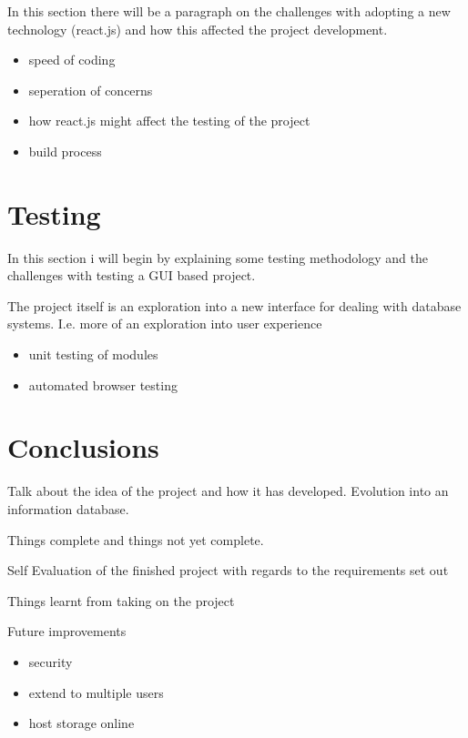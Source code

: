 \documentclass[a4paper, 11pt]{article}
\begin{document}
In this section there will be a paragraph on the challenges with adopting a new
technology (react.js) and how this affected the project development.

\begin{itemize}
  \item{speed of coding}
  \item{seperation of concerns}
  \item{how react.js might affect the testing of the project}
  \item{build process}
\end{itemize}

\section{Testing}

In this section i will begin by explaining some testing methodology and the
challenges with testing a GUI based project.

The project itself is an exploration into a new interface for dealing with
database systems. I.e. more of an exploration into user experience

\begin{itemize}
  \item{unit testing of modules}
  \item{automated browser testing}
\end{itemize}

\section{Conclusions}

Talk about the idea of the project and how it has developed.
Evolution into an information database.

Things complete and things not yet complete.

Self Evaluation of the finished project with regards to the requirements set out

Things learnt from taking on the project

Future improvements

\begin{itemize}
  \item{security}
  \item{extend to multiple users}
  \item{host storage online}
\end{itemize}
\end{document}
